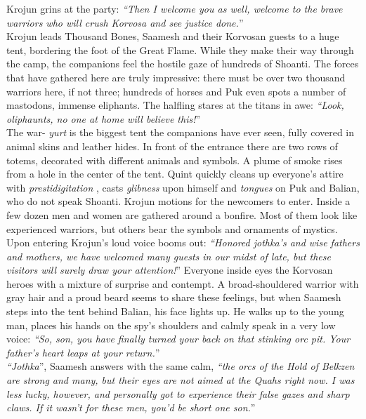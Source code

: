 Krojun grins at the party: {\itshape``Then I welcome you as well, welcome to the brave warriors who will crush Korvosa and see justice done.}''\\

Krojun leads Thousand Bones, Saamesh and their Korvosan guests to a huge tent, bordering the foot of the Great Flame. While they make their way through the camp, the companions feel the hostile gaze of hundreds of Shoanti. The forces that have gathered here are truly impressive: there must be over two thousand warriors here, if not three; hundreds of horses and Puk even spots a number of mastodons, immense eliphants. The halfling stares at the titans in awe: {\itshape``Look, oliphaunts, no one at home will believe this!}''\\

The war- {\itshape yurt} is the biggest tent the companions have ever seen, fully covered in animal skins and leather hides. In front of the entrance there are two rows of totems, decorated with different animals and symbols. A plume of smoke rises from a hole in the center of the tent. Quint quickly cleans up everyone's attire with  {\itshape prestidigitation} , casts  {\itshape glibness} upon himself and  {\itshape tongues} on Puk and Balian, who do not speak Shoanti. Krojun motions for the newcomers to enter. Inside a few dozen men and women are gathered around a bonfire. Most of them look like experienced warriors, but others bear the symbols and ornaments of mystics. Upon entering Krojun's loud voice booms out: {\itshape``Honored  {\itshape jothka's} and wise fathers and mothers, we have welcomed many guests in our midst of late, but these visitors will surely draw your attention!}'' Everyone inside eyes the Korvosan heroes with a mixture of surprise and contempt. A broad-shouldered warrior with gray hair and a proud beard seems to share these feelings, but when Saamesh steps into the tent behind Balian, his face lights up. He walks up to the young man, places his hands on the spy's shoulders and calmly speak in a very low voice: {\itshape``So, son, you have finally turned your back on that stinking orc pit. Your father's heart leaps at your return.}''\\

{\itshape``Jothka}'', Saamesh answers with the same calm, {\itshape``the orcs of the Hold of Belkzen are strong and many, but their eyes are not aimed at the Quahs right now. I was less lucky, however, and personally got to experience their false gazes and sharp claws. If it wasn't for these men, you'd be short one son.}''\\

